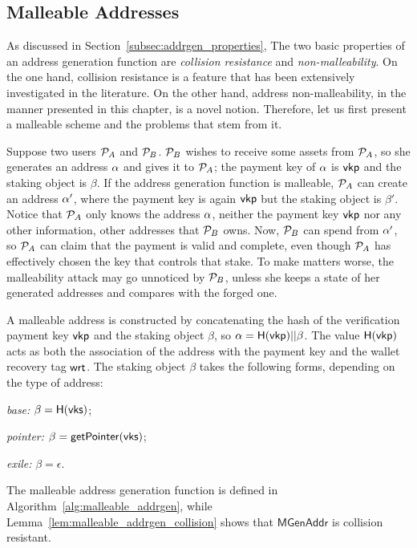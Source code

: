 \subsection{Malleable Addresses}\label{subsubsec:malleable_addrgen}

As discussed in Section~\ref{subsec:addrgen_properties}, The two basic
properties of an address generation function are \emph{collision resistance}
and \emph{non-malleability}. On the one hand, collision resistance is a
feature that has been extensively investigated in the literature. On the other
hand, address non-malleability, in the manner presented in this chapter, is a
novel notion.  Therefore, let us first present a malleable scheme and the
problems that stem from it.

Suppose two users $\mathcal{P}_{A}$ and $\mathcal{P}_{B}$. $\mathcal{P}_{B}$ wishes to receive
some assets from $\mathcal{P}_{A}$, so she generates an address $\alpha$ and gives it
to $\mathcal{P}_{A}$; the payment key of $\alpha$ is $\mathsf{vkp}$ and the
staking object is $\beta$. If the address generation function is malleable,
$\mathcal{P}_{A}$ can create an address $\alpha'$, where the payment key is again
$\mathsf{vkp}$ but the staking object is $\beta'$. Notice that
$\mathcal{P}_{A}$ only knows the address $\alpha$, \ie neither the payment key
$\mathsf{vkp}$ nor any other information, \eg other addresses that
$\mathcal{P}_{B}$ owns. Now, $\mathcal{P}_{B}$ can spend from $\alpha^\prime$, so
$\mathcal{P}_{A}$ can claim that the payment is valid and complete, even though
$\mathcal{P}_{A}$ has effectively chosen the key that controls that stake. To make
matters worse, the malleability attack may go unnoticed by $\mathcal{P}_{B}$, unless
she keeps a state of her generated addresses and compares with the forged one.

A malleable address is constructed by concatenating the hash of the
verification payment key $\mathsf{vkp}$ and the staking object $\beta$, so
$\alpha = \mathsf{H}(\mathsf{vkp}) || \beta$. The value
$\mathsf{H}(\mathsf{vkp})$ acts as both the association of the address with the
payment key and the wallet recovery tag $\mathsf{wrt}$. The staking object $\beta$ takes
the following forms, depending on the type of address:
\begin{inparaenum}[i)]
    \item \emph{base:} $\beta = \mathsf{H}(\mathsf{vks})$;
    \item \emph{pointer:} $\beta = \mathsf{getPointer}(\mathsf{vks})$;
    \item \emph{exile:} $\beta = \epsilon$.
\end{inparaenum}
The malleable address generation function is defined in
Algorithm~\ref{alg:malleable_addrgen}, while
Lemma~\ref{lem:malleable_addrgen_collision} shows that $\mathsf{MGenAddr}$ is
collision resistant.

